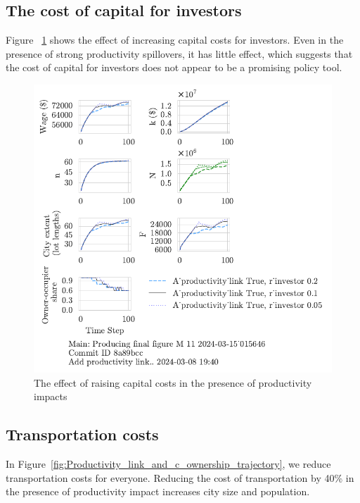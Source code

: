 \newpage
\subsection{The cost of capital for investors}
Figure ~\ref{fig:Productivity_link_and_capital_ownership_trajectory} shows the effect of increasing capital costs for investors. Even in the presence of strong productivity spillovers, it has little effect, which suggests that the cost of capital for investors does not appear to be a promising policy tool.

\begin{figure}[h!t]
    \centering
   \includegraphics[scale=1, trim={0 1.4cm 0 0},clip]{fig/With-productivity_link-r_investor-15_015646.pdf}
    \caption{The effect of raising capital costs in the presence of productivity impacts}
    \label{fig:Productivity_link_and_capital_ownership_trajectory}
\end{figure}

 
\subsection{Transportation costs}
In Figure~\ref{fig:Productivity_link_and_c_ownership_trajectory}, we reduce transportation costs for everyone. 
Reducing the cost of transportation by 40\% in the presence of productivity impact increases city size and population. 

